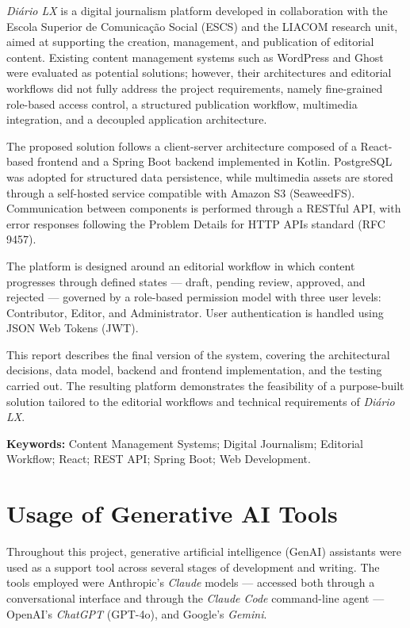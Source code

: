 \documentclass[a4paper,openany,twoside,11pt]{report}
\begin{document}
\textit{Diário LX} is a digital journalism platform developed in collaboration with the
Escola Superior de Comunicação Social (ESCS) and the LIACOM research unit, aimed
at supporting the creation, management, and publication of editorial content.
Existing content management systems such as WordPress and Ghost were evaluated as
potential solutions; however, their architectures and editorial workflows did not
fully address the project requirements, namely fine-grained role-based access
control, a structured publication workflow, multimedia integration, and a decoupled
application architecture.

The proposed solution follows a client-server architecture composed of a React-based
frontend and a Spring Boot backend implemented in Kotlin. PostgreSQL was adopted for
structured data persistence, while multimedia assets are stored through a self-hosted
service compatible with Amazon S3 (SeaweedFS). Communication between components is performed
through a RESTful API, with error responses following the Problem Details for HTTP
APIs standard (RFC 9457).

The platform is designed around an editorial workflow in which content progresses
through defined states — draft, pending review, approved, and rejected — governed
by a role-based permission model with three user levels: Contributor, Editor, and
Administrator. User authentication is handled using JSON Web Tokens (JWT).

This report describes the final version of the system, covering the architectural
decisions, data model, backend and frontend implementation, and the testing carried
out. The resulting platform demonstrates the feasibility of a purpose-built
solution tailored to the editorial workflows and technical requirements of \textit{Diário LX}.

\vspace{5mm}
\textbf{Keywords:} Content Management Systems; Digital Journalism; Editorial Workflow;
React; REST API; Spring Boot; Web Development.

\cleardoublepage
\chapter*{Usage of Generative AI Tools}

Throughout this project, generative artificial intelligence (GenAI) assistants were used
as a support tool across several stages of development and writing. The tools employed
were Anthropic's \textit{Claude} models --- accessed both through a conversational
interface and through the \textit{Claude Code} command-line agent --- OpenAI's
\textit{ChatGPT} (GPT-4o), and Google's \textit{Gemini}.
\end{document}

